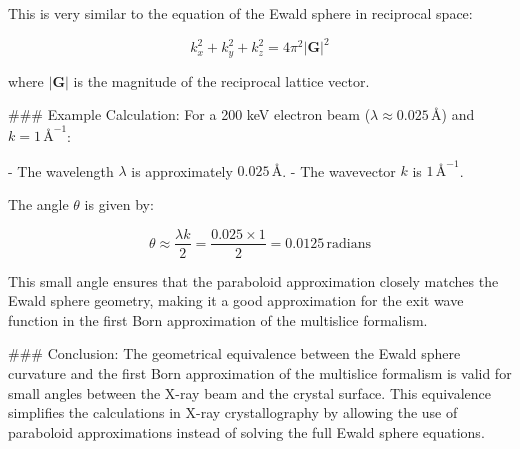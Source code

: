 This is very similar to the equation of the Ewald sphere in reciprocal space:

\[ k_x^2 + k_y^2 + k_z^2 = 4 \pi^2 |\mathbf{G}|^2 \]

where \( |\mathbf{G}| \) is the magnitude of the reciprocal lattice vector.

### Example Calculation:
For a 200 keV electron beam (\( \lambda \approx 0.025 \, \text{\AA} \)) and \( k = 1 \, \text{\AA}^{-1} \):

- The wavelength \( \lambda \) is approximately \( 0.025 \, \text{\AA} \).
- The wavevector \( k \) is \( 1 \, \text{\AA}^{-1} \).

The angle \( \theta \) is given by:

\[ \theta \approx \frac{\lambda k}{2} = \frac{0.025 \times 1}{2} = 0.0125 \, \text{radians} \]

This small angle ensures that the paraboloid approximation closely matches the Ewald sphere geometry, making it a good approximation for the exit wave function in the first Born approximation of the multislice formalism.

### Conclusion:
The geometrical equivalence between the Ewald sphere curvature and the first Born approximation of the multislice formalism is valid for small angles between the X-ray beam and the crystal surface. This equivalence simplifies the calculations in X-ray crystallography by allowing the use of paraboloid approximations instead of solving the full Ewald sphere equations.